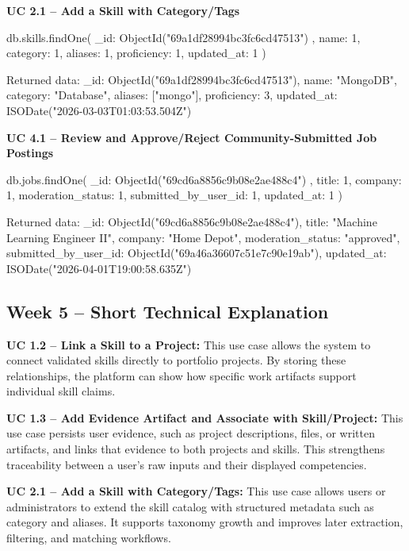 \documentclass[11pt]{article}
\begin{document}
\noindent
\textbf{UC 2.1 -- Add a Skill with Category/Tags}
\begin{TerminalBlock}
db.skills.findOne(
  { _id: ObjectId("69a1df28994bc3fc6cd47513") },
  { name: 1, category: 1, aliases: 1, proficiency: 1, updated_at: 1 }
)
\end{TerminalBlock}
\begin{TerminalBlock}
Returned data:
{
  _id: ObjectId("69a1df28994bc3fc6cd47513"),
  name: "MongoDB",
  category: "Database",
  aliases: ["mongo"],
  proficiency: 3,
  updated_at: ISODate("2026-03-03T01:03:53.504Z")
}
\end{TerminalBlock}

\noindent
\textbf{UC 4.1 -- Review and Approve/Reject Community-Submitted Job Postings}
\begin{TerminalBlock}
db.jobs.findOne(
  { _id: ObjectId("69cd6a8856c9b08e2ae488c4") },
  {
    title: 1,
    company: 1,
    moderation_status: 1,
    submitted_by_user_id: 1,
    updated_at: 1
  }
)
\end{TerminalBlock}
\begin{TerminalBlock}
Returned data:
{
  _id: ObjectId("69cd6a8856c9b08e2ae488c4"),
  title: "Machine Learning Engineer II",
  company: "Home Depot",
  moderation_status: "approved",
  submitted_by_user_id: ObjectId("69a46a36607c51e7c90e19ab"),
  updated_at: ISODate("2026-04-01T19:00:58.635Z")
}
\end{TerminalBlock}

\subsection*{Week 5 -- Short Technical Explanation}

\noindent
\textbf{UC 1.2 -- Link a Skill to a Project:}
This use case allows the system to connect validated skills directly to portfolio projects. By storing these relationships, the platform can show how specific work artifacts support individual skill claims.

\noindent
\textbf{UC 1.3 -- Add Evidence Artifact and Associate with Skill/Project:}
This use case persists user evidence, such as project descriptions, files, or written artifacts, and links that evidence to both projects and skills. This strengthens traceability between a user’s raw inputs and their displayed competencies.

\noindent
\textbf{UC 2.1 -- Add a Skill with Category/Tags:}
This use case allows users or administrators to extend the skill catalog with structured metadata such as category and aliases. It supports taxonomy growth and improves later extraction, filtering, and matching workflows.
\end{document}
